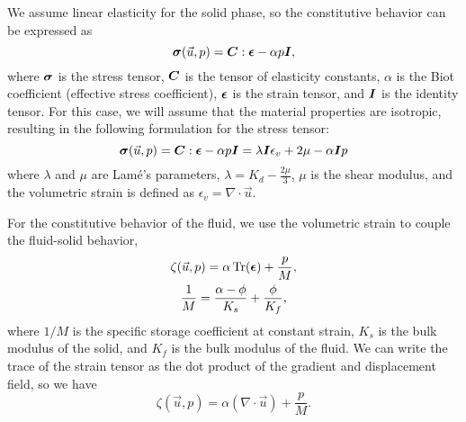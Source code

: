 We assume linear elasticity for the solid phase, so the constitutive behavior can be expressed
as
\begin{equation}
  \bm{\sigma}(\vec{u},p) = \bm{C} : \bm{\epsilon} - \alpha p \bm{I},
\end{equation}
where $\bm{\sigma}$ is the stress tensor, $\bm{C}$ is the
tensor of elasticity constants, $\alpha$ is the Biot coefficient
(effective stress coefficient), $\bm{\epsilon}$ is the strain
tensor, and $\bm{I}$ is the identity tensor.  For this case, we
will assume that the material properties are isotropic, resulting in
the following formulation for the stress tensor:
\begin{equation}
  \bm{\sigma}(\vec{u},p) = \bm{C}:\bm{\epsilon} - \alpha p \bm{I}
  = \lambda \bm{I} \epsilon_{v} + 2 \mu - \alpha \bm{I} p
\end{equation}
where $\lambda$ and $\mu$ are Lam\'e's parameters,
$\lambda = K_{d} - \frac{2 \mu}{3}$, $\mu$ is the shear modulus, and
the volumetric strain is defined as
$\epsilon_{v} = \nabla \cdot \vec{u}$.

For the constitutive behavior of the fluid, we use the volumetric
strain to couple the fluid-solid behavior,
\begin{gather}
  \zeta(\vec{u},p) = \alpha \operatorname{Tr}({\bm{\epsilon}}) + \frac{p}{M}, \\
  \frac{1}{M} = \frac{\alpha-\phi}{K_s} + \frac{\phi}{K_f},
\end{gather}
where $1/M$ is the specific storage coefficient at constant strain,
$K_s$ is the bulk modulus of the solid, and $K_f$ is the bulk modulus
of the fluid. We can write the trace of the strain tensor as the dot
product of the gradient and displacement field, so we have
\begin{equation}
  \zeta(\vec{u},p) = \alpha (\nabla \cdot \vec{u}) + \frac{p}{M}.
\end{equation}

